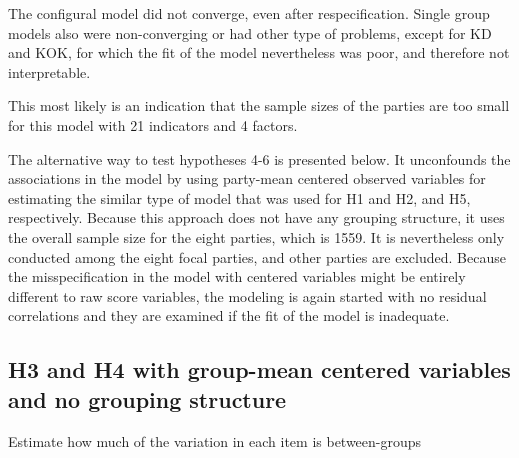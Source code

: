 \documentclass[
]{article}
\begin{document}
The configural model did not converge, even after respecification.
Single group models also were non-converging or had other type of
problems, except for KD and KOK, for which the fit of the model
nevertheless was poor, and therefore not interpretable.

This most likely is an indication that the sample sizes of the parties
are too small for this model with 21 indicators and 4 factors.

The alternative way to test hypotheses 4-6 is presented below. It
unconfounds the associations in the model by using party-mean centered
observed variables for estimating the similar type of model that was
used for H1 and H2, and H5, respectively. Because this approach does not
have any grouping structure, it uses the overall sample size for the
eight parties, which is 1559. It is nevertheless only conducted among
the eight focal parties, and other parties are excluded. Because the
misspecification in the model with centered variables might be entirely
different to raw score variables, the modeling is again started with no
residual correlations and they are examined if the fit of the model is
inadequate.

\newpage

\hypertarget{h3-and-h4-with-group-mean-centered-variables-and-no-grouping-structure}{%
\subsection{H3 and H4 with group-mean centered variables and no grouping
structure}\label{h3-and-h4-with-group-mean-centered-variables-and-no-grouping-structure}}

Estimate how much of the variation in each item is between-groups
\end{document}
